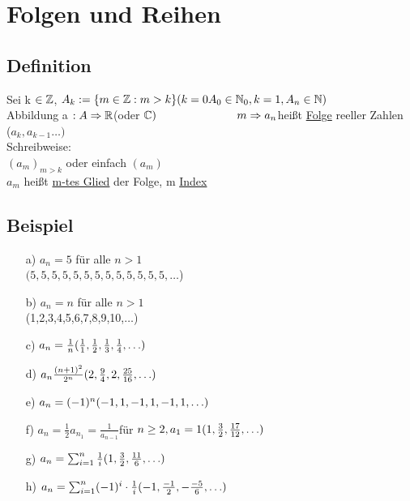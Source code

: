 \section{Folgen und Reihen}
\subsection{Definition}
Sei k $\in \mathbb{Z}$,
$A_k := \{ m \in \mathbb{Z} : m > k\}\\
(k = 0 A_0 \in \mathbb{N}_0, k = 1 , A_n \in \mathbb{N})$\\
Abbildung a $: A \Rightarrow \mathbb{R} $(oder $\mathbb{C})\\
\hspace*{2.5cm} m \Rightarrow a_n\\
$hei\ss t \underline{Folge} reeller Zahlen\\
\hspace*{2.5cm} ($a_k,a_{k-1} \ldots)$\\
Schreibweise:\\
$(a_m)_{m>k}$ oder einfach $(a_m)$\\
$a_m$ hei\ss t \underline{m-tes Glied} der Folge, m \underline{Index}\\
\subsection{Beispiel}
\begin{enumerate}
\item[a)] $a_n = 5$ f\"ur alle $n > 1$\\
$(5,5,5,5,5,5,5,5,5,5,5,5,5,\ldots$)\\
\item[b)] $a_n = n$ f\"ur alle $n>1$\\
 (1,2,3,4,5,6,7,8,9,10,$\ldots$)\\
\item[c)] $a_n = \frac{1}{n}\\
(\frac{1}{1}, \frac{1}{2} ,\frac{1}{3}, \frac{1}{4}, \ldots)$\\
\item[d)]$a_n \frac{(n+1)^2}{2^n}\\
(2, \frac{9}{4},2,\frac{25}{16}, \ldots)$\\
\item[e)]$a_n = (-1)^n\\
(-1,1,-1,1,-1,1,\ldots)\\ $
\item[f)]$a_n = \frac{1}{2}a_{n_1} = \frac{1}{a_{n-1}} $f\"ur $n\geq 2,
a_1 =1\\
(1,\frac{3}{2},\frac{17}{12}, \ldots)$
\item[g)]$a_n = \sum_{i=1}^{n} \frac{1}{i}\\
(1,\frac{3}{2}, \frac{11}{6},\ldots)$
\item[h)]$a_n = \sum_{i=1}^{n} (-1)^i\cdot \frac{1}{i}\\
(-1,\frac{-1}{2},-\frac{-5}{6},\ldots)$
\end{enumerate}
